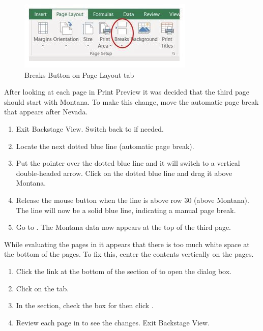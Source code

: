 \begin{figure}[H]
	\centering
	\includegraphics[width=\maxwidth{.95\linewidth}]{gfx/ch03_fig31}
	\caption{Breaks Button on Page Layout tab}
	\label{03:fig31}
\end{figure}

After looking at each page in Print Preview it was decided that the third page should start with Montana. To make this change, move the automatic page break that appears after Nevada.

\begin{enumerate}
	\item Exit Backstage View. Switch back to  if needed.
	\item Locate the next dotted blue line (automatic page break).
	\item Put the pointer over the dotted blue line and it will switch to a vertical double-headed arrow. Click on the dotted blue line and drag it above Montana.
	\item Release the mouse button when the line is above row $ 30 $ (above Montana). The line will now be a solid blue line, indicating a manual page break.
	\item Go to . The Montana data now appears at the top of the third page.
\end{enumerate}

While evaluating the pages in  it appears that there is too much white space at the bottom of the pages. To fix this, center the contents vertically on the pages.

\begin{enumerate}
	\item Click the  link at the bottom of the  section of  to open the  dialog box.
	\item Click on the  tab.
	\item In the  section, check the box for  then click .
	\item Review each page in  to see the changes. Exit Backstage View.
\end{enumerate}

